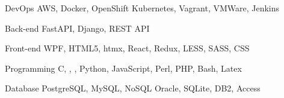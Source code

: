 

\begin{cvskills}

  \cvskill
    {DevOps} %
    {AWS, Docker, OpenShift Kubernetes, Vagrant, VMWare, Jenkins} %

  \cvskill
    {Back-end} %
    {FastAPI, Django, REST API} %

  \cvskill
    {Front-end} %
    {WPF, HTML5, htmx, React, Redux, LESS, SASS, CSS} %

  \cvskill
    {Programming} %
    {C, \Cpp, \Csh, Python, JavaScript, Perl, PHP, Bash, Latex} %


  \cvskill
	{Database} %
	{PostgreSQL, MySQL, NoSQL Oracle, SQLite, DB2, Access} %

\end{cvskills}


